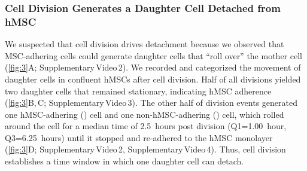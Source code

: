 \vspace{-.3cm}
\subsubsection*{Cell Division Generates a Daughter Cell Detached from hMSC}
We suspected that cell division drives detachment because we observed that
MSC-adhering \INA cells could generate daughter cells that “roll over” the
mother cell (\autoref{fig:3}A; Supplementary\,Video\,2). We recorded and
categorized the movement of \INA daughter cells in confluent hMSCs after cell
division. Half of all \INA divisions yielded two daughter cells that remained
stationary, indicating hMSC adherence (\autoref{fig:3}B,\,C;
Supplementary\,Video\,3). The other half of division events generated one
hMSC-adhering (\MAina) cell and one non-hMSC-adhering (\nMAina) cell, which
rolled around the \MAina cell for a median time of \SI{2.5}{hours} post division
(Q1=\SI{1.00}{hour}, Q3=\SI{6.25}{hours}) until it stopped and re-adhered to the
hMSC monolayer (\autoref{fig:3}D; Supplementary\,Video\,2,
Supplementary\,Video\,4). Thus, cell division establishes a time window in which
one daughter cell can detach.



